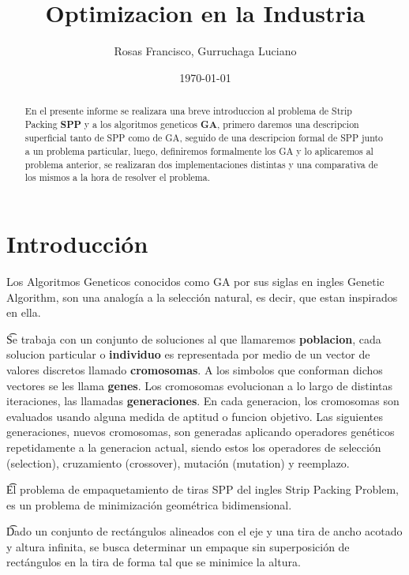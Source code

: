 \documentclass[10pt]{article}
\title{Optimizacion en la Industria} %
\author{Rosas Francisco, Gurruchaga Luciano}
\date{\today} %
\begin{document}
\maketitle

\begin{abstract}
En el presente informe se realizara una breve introduccion al problema de Strip Packing \textbf{SPP} y a los algoritmos geneticos \textbf{GA}, primero daremos una descripcion superficial tanto de SPP como de GA, seguido de una descripcion formal de SPP junto a un problema particular, luego, definiremos formalmente los GA y lo aplicaremos al problema anterior, se realizaran dos implementaciones distintas y una comparativa de los mismos a la hora de resolver el problema. 

\end{abstract}


\section{Introducción}


Los Algoritmos Geneticos conocidos como GA por sus siglas en ingles Genetic Algorithm, son una analogía a la selección natural, es decir, que estan inspirados en ella.

\t Se trabaja con un conjunto de soluciones al que llamaremos \textbf{poblacion}, cada solucion particular o \textbf{individuo} es representada por medio de un vector de valores discretos llamado \textbf{cromosomas}. A los simbolos que conforman dichos vectores se les llama \textbf{genes}. Los cromosomas evolucionan a lo largo de distintas iteraciones, las llamadas \textbf{generaciones}. En cada generacion, los cromosomas son evaluados usando alguna medida de aptitud o funcion objetivo. Las siguientes generaciones, nuevos cromosomas, son generadas aplicando operadores genéticos repetidamente a la generacion actual, siendo estos los operadores de selección (selection), cruzamiento (crossover), mutación (mutation) y reemplazo.

\t El problema de empaquetamiento de tiras SPP del ingles Strip Packing Problem, es un problema de minimización geométrica bidimensional.

\t Dado un conjunto de rectángulos alineados con el eje y una tira de ancho acotado y altura infinita, se busca determinar un empaque sin superposición de rectángulos en la tira de forma tal que se minimice la altura.
\end{document}
